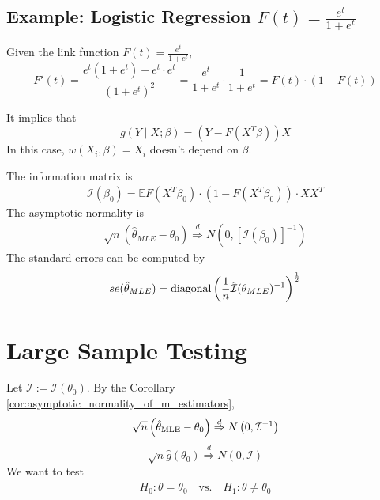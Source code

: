 \documentclass[11pt]{elegantbook}
\begin{document}
\subsection{Example: Logistic Regression $F(t)=\frac{e^t}{1+e^t}$}
\begin{lemma}
    Given the link function $F(t)=\frac{e^t}{1+e^t}$, $$F'(t)=\frac{e^t(1+e^t)-e^t\cdot e^t}{(1+e^t)^2}=\frac{e^t}{1+e^t}\cdot\frac{1}{1+e^t}=F(t)\cdot(1-F(t))$$
\end{lemma}
It implies that $$g(Y\mid X;\beta)=\left(Y-F(X^T\beta)\right)X$$
In this case, $w(X_i,\beta)=X_i$ doesn't depend on $\beta$.

The information matrix is
\begin{equation}
    \begin{aligned}
        \mathcal{I}(\beta_0)=\mathbb{E}F(X^T\beta_0)\cdot(1-F(X^T\beta_0))\cdot X X^T
    \end{aligned}
    \nonumber
\end{equation}
The asymptotic normality is
\begin{equation}
    \begin{aligned}
        \sqrt{n}\left(\hat{\theta}_{MLE}-\theta_0\right) \stackrel{d}{\Rightarrow} N\left(0,[\mathcal{I}(\beta_0)]^{-1}\right)
    \end{aligned}
    \nonumber
\end{equation}
The standard errors can be computed by
\begin{equation}
    \begin{aligned}
        se(\hat{\theta}_{MLE})=\textnormal{diagonal}\left(\frac{1}{n}\hat{\mathcal{I}}(\theta_{MLE})^{-1}\right)^{\frac{1}{2}}
    \end{aligned}
    \nonumber
\end{equation}



\section{Large Sample Testing}
Let $\mathcal{I}:=\mathcal{I}(\theta_0)$. By the Corollary \ref{cor:asymptotic_normality_of_m_estimators},
$$\sqrt{n}\left(\hat{\theta}_\textnormal{MLE}-\theta_0\right) \stackrel{d}{\Rightarrow} N\left(0,\mathcal{I}^{-1}\right)$$
$$\sqrt{n}\hat{g}(\theta_0)\stackrel{d}{\Rightarrow} N\left(0,\mathcal{I}\right)$$
We want to test
\begin{equation}
    \begin{aligned}
        H_0:\theta=\theta_0 \quad \text{vs.} \quad H_1:\theta\neq\theta_0
    \end{aligned}
    \nonumber
\end{equation}
\end{document}
